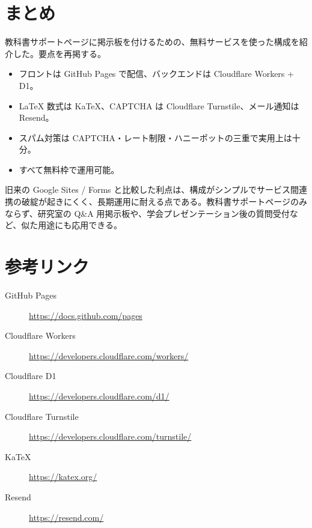 \documentclass[11pt,a4paper,uplatex,dvipdfmx]{jsarticle}
\begin{document}
\section{まとめ}

教科書サポートページに掲示板を付けるための、無料サービスを使った構成を紹介した。要点を再掲する。

\begin{itemize}
\item フロントは GitHub Pages で配信、バックエンドは Cloudflare Workers + D1。
\item \LaTeX{} 数式は KaTeX、CAPTCHA は Cloudflare Turnstile、メール通知は Resend。
\item スパム対策は CAPTCHA・レート制限・ハニーポットの三重で実用上は十分。
\item すべて無料枠で運用可能。
\end{itemize}

旧来の Google Sites / Forms と比較した利点は、構成がシンプルでサービス間連携の破綻が起きにくく、長期運用に耐える点である。教科書サポートページのみならず、研究室の Q\&A 用掲示板や、学会プレゼンテーション後の質問受付など、似た用途にも応用できる。

\appendix

\section{参考リンク}

\begin{description}
\item[GitHub Pages] \url{https://docs.github.com/pages}
\item[Cloudflare Workers] \url{https://developers.cloudflare.com/workers/}
\item[Cloudflare D1] \url{https://developers.cloudflare.com/d1/}
\item[Cloudflare Turnstile] \url{https://developers.cloudflare.com/turnstile/}
\item[KaTeX] \url{https://katex.org/}
\item[Resend] \url{https://resend.com/}
\end{description}
\end{document}
